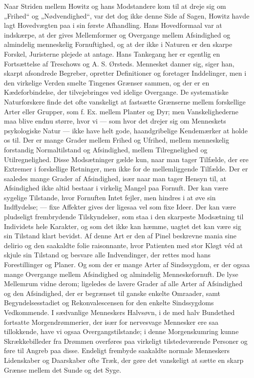 \documentclass[12pt,a4paper,openany]{book}
\newcommand{\opage}[1]{\marginnote{\footnotesize\textit{[#1]}}}
\begin{document}
Naar Striden mellem Howitz og hans Modstandere kom til at dreje sig om „Frihed“
og „Nødvendighed“, var det dog ikke denne Side af Sagen, Howitz havde lagt
Hovedvægten paa i sin første Afhandling. Hans Hovedformaal var at indskærpe, at
der gives Mellemformer og Overgange mellem Afsindighed og almindelig
menneskelig Fornuftighed, og at der ikke i Naturen er den skarpe Forskel,
Juristerne plejede at antage. Hans Tankegang her er egentlig en Fortsættelse af
Treschows og A. S. Ørsteds. Mennesket danner sig, siger han, skarpt afsondrede
Begreber, opretter Definitioner og foretager Inddelinger, men i den virkelige
Verden smelte Tingenes Grænser sammen, og der er en Kædeforbindelse, der
tilvejebringes ved idelige Overgange. De systematiske Naturforskere finde det
ofte vanskeligt at fastsætte Grænserne mellem forskellige Arter eller Grupper,
som f. Ex. mellem Planter og Dyr; men Vanskelighederne maa blive endnu større,
hvor vi --- som hvor det drejer sig om Menneskets psykologiske Natur --- ikke
have helt gode, haandgribelige Kendemærker at holde os til. Der er mange Grader
mellem Frihed og Ufrihed, mellem menneskelig forstandig Normaltilstand og
Afsindighed, mellem Tilregnelighed og Utilregnelighed. Disse Modsætninger gælde
kun, naar man tager Tilfælde, der ere Extremer i forskellige Retninger, men
ikke for de mellemliggende Tilfælde. Der er saaledes mange Grader af
Afsindighed, især naar man tager Hensyn til, at Afsindighed ikke altid bestaar
i virkelig Mangel paa Fornuft. Der kan være sygelige Tilstande, hvor Fornuften
Intet fejler, men hindres i at
\setcounter{footnote}{0}%
\opage{83}øve sin Indflydelse; --- fixe Affekter gives der ligesaa vel som fixe
Ideer. Der kan være pludseligt frembrydende Tilskyndelser, som staa i den
skarpeste Modsætning til Individets hele Karakter, og som det ikke kan hæmme,
uagtet det kan være sig sin Tilstand klart bevidst. Af denne Art er den af
Pinel beskrevne mania sine delirio og den saakaldte folie raisonnante, hvor
Patienten med stor Kløgt véd at skjule sin Tilstand og besvare alle
Indvendinger, der rettes mod hans Forestillinger og Planer. Og som der er mange
Arter af Sindssygdom, er der ogsaa mange Overgange mellem Afsindighed og
almindelig Menneskefornuft. De lyse Mellemrum vidne derom; ligeledes de lavere
Grader af alle Arter af Afsindighed og den Afsindighed, der er begrænset til
ganske enkelte Omraader, samt Begyndelsesstadiet og Rekonvalescensen for den
enkelte Sindssygdoms Vedkommende. I sædvanlige Menneskers Halvsøvn, i de med
halv Bundethed fortsatte Morgendrømmerier, der især for nervesvage Mennesker
ere saa tillokkende, have vi ogsaa Overgangstilstande; i denne Morgenskumring
kunne Skrækkebilleder fra Drømmen overføres paa virkeligt tilstedeværende
Personer og føre til Angreb paa disse. Endeligt frembyde saakaldte normale
Menneskers Lidenskaber og Daarskaber ofte Træk, der gøre det vanskeligt at
sætte en skarp Grænse mellem det Sunde og det Syge.
\end{document}
